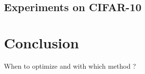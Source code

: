 \subsection{Experiments on CIFAR-10}

\section{Conclusion}

When to optimize and with which method ?
